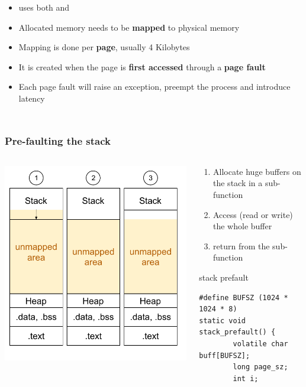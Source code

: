 \begin{frame}
\begin{columns}
\begin{itemize}
				\item {} uses both  and 
				\item Allocated memory needs to be \textbf{mapped} to physical memory
				\item Mapping is done per \textbf{page}, usually 4 Kilobytes
				\item It is created when the page is \textbf{first accessed} through a \textbf{page fault}
				\item Each page fault will raise an exception, preempt the process and introduce latency
			\end{itemize}
	\end{columns}
\end{frame}

\begin{frame}[fragile]
	\frametitle{Pre-faulting the stack}
	\begin{columns}
		\begin{column}{0.35\textwidth}
    \includegraphics[width=\textwidth]{slides/realtime-linux-application-development/prefault_stack.pdf}
		\end{column}
		\begin{column}{0.65\textwidth}
			\begin{enumerate}
				\item Allocate huge buffers on the stack in a sub-function
				\item Access (read or write) the whole buffer
				\item return from the sub-function
			\end{enumerate}
			\begin{block}{stack prefault}
			\fontsize{8}{7}\selectfont
				\begin{verbatim}
#define BUFSZ (1024 * 1024 * 8)
static void stack_prefault() {
        volatile char buff[BUFSZ];
        long page_sz;
        int i;


\end{verbatim}
\end{block}
\end{column}
\end{columns}
\end{frame}
